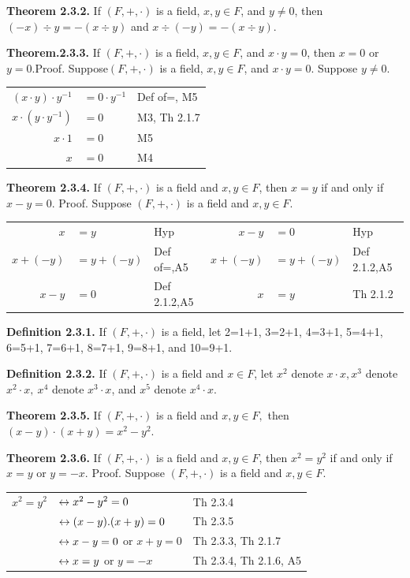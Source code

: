 \begin{large}
\textbf{Theorem 2.3.2.} If $(F,+,\cdot )$ is a field, $x,y\in F$, and $y \neq 0$, then $(-x)\div y =-(x\div y)$ and $x\div (-y) = -(x\div y).$\nl

\textbf{Theorem.2.3.3.} If $(F,+,\cdot )$ is a field, $x,y \in F$, and $x\cdot y=0$, then $x =0$ or $y = 0.$\nl Proof. Suppose$ (F,+,\cdot)$ is a field, $x,y \in F$, and $x\cdot y = 0$.\nl
 Suppose $y \neq 0.$\nl

\begin{tabular}{r l l}
$(x\cdot y)\cdot y^{-1}$ & $=0\cdot y^{-1}$ & Def of=, M5 \\
$x\cdot (y\cdot y^{-1})$ &$= 0$ &M3, Th 2.1.7 \\
$x\cdot 1$ &$= 0$ &M5 \\
$x$&$=0$& M4 \\
\end{tabular}
\newpage

\textbf{Theorem 2.3.4.} If $(F,+,\cdot)$ is a field and $x,y\in F$, then $x = y$ if and only
if $x - y = 0$.
Proof. Suppose $(F,+,\cdot )$ is a field and $x,y\in F.$
\begin{tabular}{r l l r l l}
$x$ &$=y$ &Hyp &$x - y$ &$= 0$ &Hyp\\
$x+(-y)$&$=y+(-y)$& Def of=,A5 &$x+(-y)$&$=y+(-y)$&Def 2.1.2,A5\\
$x-y$&$=0$& Def 2.1.2,A5 &$x$&$=y$ & Th 2.1.2 \\
\end{tabular}\nl

\textbf{Definition 2.3.1.} If $(F,+,\cdot)$ is a field, let 2=1+1, 3=2+1, 4=3+1, 5=4+1, 6=5+1, 7=6+1,   8=7+1, 9=8+1, and 10=9+1.\nl

\textbf{Definition 2.3.2.} If $(F,+,\cdot)$ is a field and $x\in F$, let $x^2$ denote $x\cdot x, x^{3}$ denote $x^{2}\cdot x,~x^{4}$ denote $x^{3}\cdot x$, and $x^{5}$ denote $x^{4}\cdot x.$\nl

\textbf{Theorem 2.3.5.} If $(F,+,\cdot )$ is a field and $x,y \in F,$ then $(x-y)\cdot(x+y)=x^{2} - y^{2}.$ \nl

\textbf{Theorem 2.3.6.} If $(F,+,\cdot )$ is a field and $x,y \in F$, then $x^{2} =y^{2}$ if and only if $x = y$ or $y = -x.$\nl
Proof. Suppose $(F,+,\cdot )$ is a field and $x,y\in F.$\nl
\begin{tabular}{r l l}
$x^{2} =y^{2}$& $\leftrightarrow x^{2} - y^{2} =0$ &Th 2.3.4 \\
&$\leftrightarrow(x-y).(x+y)=0$ & Th 2.3.5 \\
&$\leftrightarrow x-y=0$ or $x+y=0$ &Th 2.3.3, Th 2.1.7 \\
&$\leftrightarrow x=y$ or $y=-x$ & Th 2.3.4, Th 2.1.6, A5\\
\end{tabular}\nl


\end{large}
